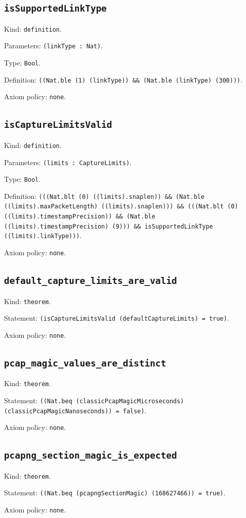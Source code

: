 \documentclass[11pt]{article}
\begin{document}
\subsection*{\texttt{isSupportedLinkType}}
\noindent Kind: \texttt{definition}.\par
\noindent Parameters: \texttt{(linkType : Nat)}.\par
\noindent Type: \texttt{Bool}.\par
\noindent Definition: \texttt{((Nat.ble (1) (linkType)) \&\& (Nat.ble (linkType) (300)))}.\par
\noindent Axiom policy: \texttt{none}.\par
\subsection*{\texttt{isCaptureLimitsValid}}
\noindent Kind: \texttt{definition}.\par
\noindent Parameters: \texttt{(limits : CaptureLimits)}.\par
\noindent Type: \texttt{Bool}.\par
\noindent Definition: \texttt{(((Nat.blt (0) ((limits).snaplen)) \&\& (Nat.ble ((limits).maxPacketLength) ((limits).snaplen))) \&\& (((Nat.blt (0) ((limits).timestampPrecision)) \&\& (Nat.ble ((limits).timestampPrecision) (9))) \&\& isSupportedLinkType ((limits).linkType)))}.\par
\noindent Axiom policy: \texttt{none}.\par
\subsection*{\texttt{default\_capture\_limits\_are\_valid}}
\noindent Kind: \texttt{theorem}.\par
\noindent Statement: \texttt{(isCaptureLimitsValid (defaultCaptureLimits) = true)}.\par
\noindent Axiom policy: \texttt{none}.\par
\subsection*{\texttt{pcap\_magic\_values\_are\_distinct}}
\noindent Kind: \texttt{theorem}.\par
\noindent Statement: \texttt{((Nat.beq (classicPcapMagicMicroseconds) (classicPcapMagicNanoseconds)) = false)}.\par
\noindent Axiom policy: \texttt{none}.\par
\subsection*{\texttt{pcapng\_section\_magic\_is\_expected}}
\noindent Kind: \texttt{theorem}.\par
\noindent Statement: \texttt{((Nat.beq (pcapngSectionMagic) (168627466)) = true)}.\par
\noindent Axiom policy: \texttt{none}.\par
\end{document}
